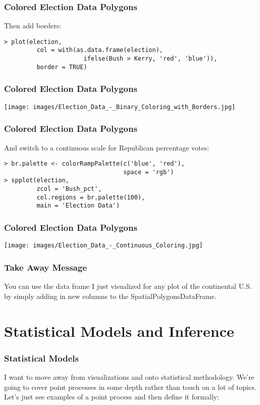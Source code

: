\documentclass{beamer}
\begin{document}
\begin{frame}[fragile]
	\frametitle{Colored Election Data Polygons}

	Then add borders:
	
	\begin{verbatim}
> plot(election,
     	 col = with(as.data.frame(election),
	                  ifelse(Bush > Kerry, 'red', 'blue')),
     	 border = TRUE)
	\end{verbatim}
\end{frame}

\frame
{	
	\frametitle{Colored Election Data Polygons}
	
	\begin{center}
		\texttt{[image: images/Election\_Data\_-\_Binary\_Coloring\_with\_Borders.jpg]}
	\end{center}
}

\begin{frame}[fragile]
	\frametitle{Colored Election Data Polygons}

	And switch to a continuous scale for Republican percentage votes: 
	
	\begin{verbatim}
> br.palette <- colorRampPalette(c('blue', 'red'),
                                 space = 'rgb')
> spplot(election,
         zcol = 'Bush_pct',
         col.regions = br.palette(100),
         main = 'Election Data')

	\end{verbatim}
\end{frame}

\frame
{	
	\frametitle{Colored Election Data Polygons}
	
	\begin{center}
		\texttt{[image: images/Election\_Data\_-\_Continuous\_Coloring.jpg]}
	\end{center}
}

\begin{frame}[fragile]
	\frametitle{Take Away Message}
	
	You can use the data frame I just visualized for any plot of the continental U.S. by simply adding in new columns to the SpatialPolygonsDataFrame.
\end{frame}

\section{Statistical Models and Inference}
\begin{frame}[fragile]
	\frametitle{Statistical Models}

	I want to move away from visualizations and onto statistical methodology. We're going to cover point processes in some depth rather than touch on a lot of topics. Let's just see examples of a point process and then define it formally:
\end{frame}
\end{document}
